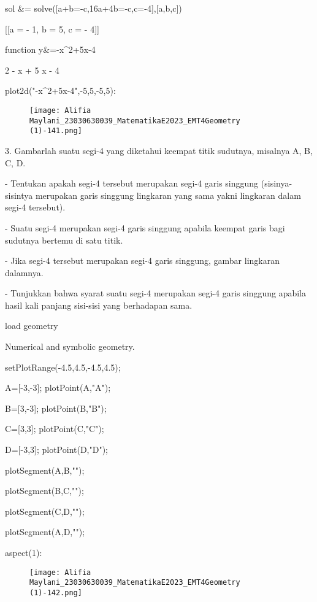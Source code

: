 \documentclass{article}
\begin{document}
\>sol &= solve([a+b=-c,16\*a+4\*b=-c,c=-4],[a,b,c])


    
                         [[a = - 1, b = 5, c = - 4]]
    

\>function y&=-x^2+5\*x-4


    
                                   2
                                - x  + 5 x - 4
    

\>plot2d("-x^2+5\*x-4",-5,5,-5,5):


\begin{figure}
    \centering
    \texttt{[image: Alifia Maylani\_23030630039\_MatematikaE2023\_EMT4Geometry (1)-141.png]}
    \caption{}
    \label{fig:enter-label}
\end{figure}

3. Gambarlah suatu segi-4 yang diketahui keempat titik sudutnya,
misalnya A, B, C, D.


   - Tentukan apakah segi-4 tersebut merupakan segi-4 garis singgung
(sisinya-sisintya merupakan garis singgung lingkaran yang sama yakni
lingkaran dalam segi-4 tersebut).


   - Suatu segi-4 merupakan segi-4 garis singgung apabila keempat
garis bagi sudutnya bertemu di satu titik.


   - Jika segi-4 tersebut merupakan segi-4 garis singgung, gambar
lingkaran dalamnya.


   - Tunjukkan bahwa syarat suatu segi-4 merupakan segi-4 garis
singgung apabila hasil kali panjang sisi-sisi yang berhadapan sama.


\>load geometry


    Numerical and symbolic geometry.

\>setPlotRange(-4.5,4.5,-4.5,4.5);

\>A=[-3,-3]; plotPoint(A,"A");

\>B=[3,-3]; plotPoint(B,"B");

\>C=[3,3]; plotPoint(C,"C");

\>D=[-3,3]; plotPoint(D,"D");

\>plotSegment(A,B,"");

\>plotSegment(B,C,"");

\>plotSegment(C,D,"");

\>plotSegment(A,D,"");

\>aspect(1):


\begin{figure}
    \centering
    \texttt{[image: Alifia Maylani\_23030630039\_MatematikaE2023\_EMT4Geometry (1)-142.png]}
    \caption{}
    \label{fig:enter-label}
\end{figure}
\end{document}

